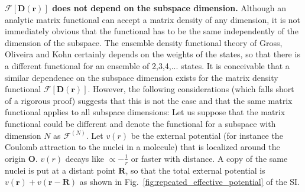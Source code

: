 \documentclass[journal=jpclcd,manuscript=letter]{achemso}
\newcommand\m[1]{\mathbf{#1}}
\renewcommand\vec[1]{\mathbf{#1}}
\begin{document}
\textbf{$\m{\mathcal{F}}[\m{D}(\vec{r})]$ does not depend on the subspace dimension.}
Although an analytic matrix functional can accept a matrix density of any dimension, it is not immediately obvious that the functional has to be the same independently of the dimension of the subspace. The ensemble density functional theory of Gross, Oliveira and Kohn \cite{Gross1988ReyleighRitz,Gross1988EnsembleDFT} certainly depends on the weights of the states, so that there is a different functional for an ensemble of 2,3,4,... states. It is conceivable that a similar dependence on the subspace dimension exists for the matrix density functional $\m{\mathcal{F}}[\m{D}(\vec{r})]$.
However, the following considerations (which falls short of a rigorous proof) suggests that this is not the case and that the same matrix functional applies to all subspace dimensions:
Let us suppose that the matrix functional could be different and denote the functional for a subspace with dimension $N$ as $\m{\mathcal{F}}^{(N)}$.
Let $v(r)$ be the external potential (for instance the Coulomb attraction to the nuclei in a molecule) that is localized around the origin $\vec{O}$. $v(r)$ decays like $\propto -\frac{1}{r}$ or faster with distance. A copy of the same nuclei is put at a distant point $\vec{R}$,
so that the total external potential is $v(\vec{r}) + v(\vec{r}-\vec{R})$
as shown in Fig.~\ref{fig:repeated_effective_potential} of the SI.

\end{document}
